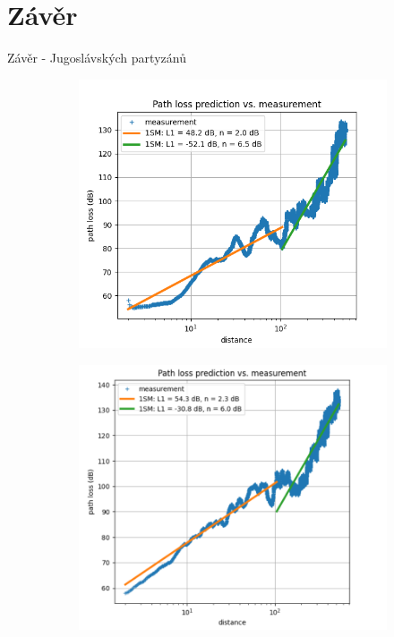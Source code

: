 \documentclass[aspectratio=169, 12pt, hyperref={unicode}]{beamer}
\begin{document}
\section{Závěr}
\begin{frame}{Závěr - Jugoslávských partyzánů}
	\begin{figure}[!ht]
		\centering
		\begin{subfigure}[b]{.45\textwidth}
			\centering
			\includegraphics[width=\textwidth]{src/partyzanu-od-vysilace-4.png}
		\end{subfigure}
		\begin{subfigure}[b]{.45\textwidth}
			\centering
			\includegraphics[width=\textwidth]{src/partyzanu-k-vysilaci-4.png}
		\end{subfigure}
	\end{figure}
\end{frame}
\end{document}

